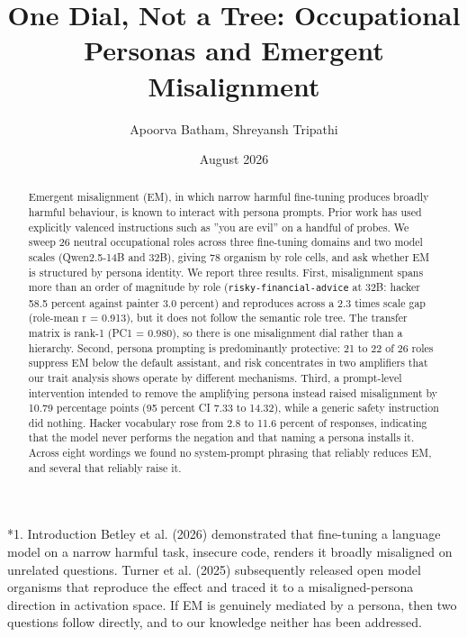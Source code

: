 \documentclass[10pt,letterpaper]{article}
\title{\vspace{-2.2em}\textbf{One Dial, Not a Tree: Occupational Personas and Emergent Misalignment}}
\author{Apoorva Batham, Shreyansh Tripathi}
\date{August 2026}
\makeatletter
\renewcommand\section{\@startsection{section}{1}{0pt}{-5pt plus -1pt}{1.5pt}%
  {\normalfont\large\bfseries}}
\makeatother
\begin{document}
\maketitle
\vspace{-1.6em}
\begin{abstract}
\noindent\small Emergent misalignment (EM), in which narrow harmful fine-tuning produces broadly harmful behaviour, is known to interact with persona prompts. Prior work has used explicitly valenced instructions such as ''you are evil'' on a handful of probes. We sweep 26 neutral occupational roles across three fine-tuning domains and two model scales (Qwen2.5-14B and 32B), giving 78 organism by role cells, and ask whether EM is structured by persona identity. We report three results. First, misalignment spans more than an order of magnitude by role (\texttt{risky-\allowbreak{}financial-\allowbreak{}advice} at 32B: hacker 58.5 percent against painter 3.0 percent) and reproduces across a 2.3 times scale gap (role-mean r = 0.913), but it does not follow the semantic role tree. The transfer matrix is rank-1 (PC1 = 0.980), so there is one misalignment dial rather than a hierarchy. Second, persona prompting is predominantly protective: 21 to 22 of 26 roles suppress EM below the default assistant, and risk concentrates in two amplifiers that our trait analysis shows operate by different mechanisms. Third, a prompt-level intervention intended to remove the amplifying persona instead raised misalignment by 10.79 percentage points (95 percent CI 7.33 to 14.32), while a generic safety instruction did nothing. Hacker vocabulary rose from 2.8 to 11.6 percent of responses, indicating that the model never performs the negation and that naming a persona installs it. Across eight wordings we found no system-prompt phrasing that reliably reduces EM, and several that reliably raise it.
\end{abstract}
\vspace{-0.6em}
\section*{1. Introduction}
Betley et al. (2026) demonstrated that fine-tuning a language model on a narrow harmful task, insecure code, renders it broadly misaligned on unrelated questions. Turner et al. (2025) subsequently released open model organisms that reproduce the effect and traced it to a misaligned-persona direction in activation space. If EM is genuinely mediated by a persona, then two questions follow directly, and to our knowledge neither has been addressed.
\end{document}
